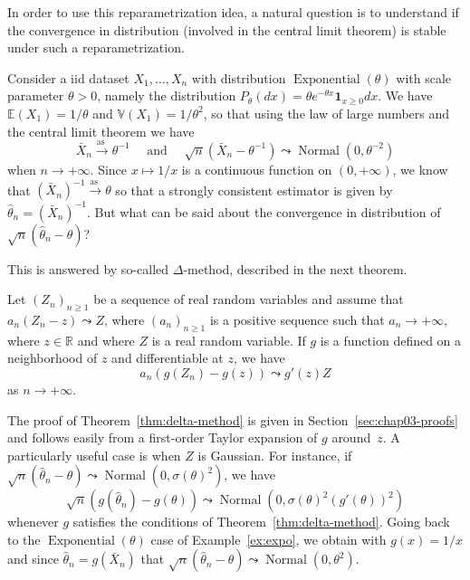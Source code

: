 \documentclass[
	fontsize=11pt, %
	twoside=false, %
	numbers=noenddot, %
]{kaobook}
\DeclareMathOperator{\expo}{Exponential}
\DeclareMathOperator{\nor}{Normal}
\newcommand{\E}{\mathbb E}
\newcommand{\R}{\mathbb R}
\newcommand{\var}{\mathbb V}
\newcommand{\wh}{\widehat}
\newcommand{\ind}[1]{\mathbf 1_{#1}}
\newcommand{\goes}{\rightarrow}
\newcommand{\goas}{\overset{\text{as\ }}{\rightarrow}}
\begin{document}
In order to use this reparametrization idea, a natural question is to understand if the convergence in distribution (involved in the central limit theorem) is stable under such a reparametrization.
\begin{example}
	\label{ex:expo}
	Consider a iid dataset $X_1, \ldots, X_n$ with distribution $\expo(\theta)$ with scale parameter $\theta > 0$, namely the distribution $P_\theta(dx) = \theta e^{-\theta x} \ind{x \geq 0} dx$. 
	We have $\E(X_1) = 1 / \theta$ and $\var(X_1) = 1 / \theta^2$, so that using the law of large numbers and the central limit theorem we have
	\begin{equation*}
		\bar X_n \goas \theta^{-1} \quad \text{ and } \quad \sqrt n (\bar X_n - \theta^{-1}) \leadsto \nor(0, \theta^{-2})
	\end{equation*}
	when $n \rightarrow +\infty$.
	Since $x \mapsto 1 / x$ is a continuous function on $(0, +\infty)$, we know that $(\bar X_n)^{-1} \goas \theta$ so that a strongly consistent estimator is given by $\wh \theta_n = (\bar X_n)^{-1}$.
	But what can be said about the convergence in distribution of $\sqrt n (\wh \theta_n - \theta)$?
\end{example}
This is answered by so-called $\Delta$-method, described in the next theorem.
\begin{theorem}
	\label{thm:delta-method}
 	Let $(Z_n)_{n \geq 1}$ be a sequence of real random variables and assume that 
	$a_n(Z_n - z) \leadsto Z$, where $(a_n)_{n \geq 1}$ is a positive sequence such that $a_n \goes +\infty$, where $z \in \R$ and where $Z$ is a real random variable.
 	If $g$ is a function defined on a neighborhood of $z$ and differentiable at $z$, we have 
 	\begin{equation}
 		a_n (g(Z_n) - g(z)) \leadsto g'(z) Z
 	\end{equation}
 	as $n \goes +\infty$.
\end{theorem}
The proof of Theorem~\ref{thm:delta-method} is given in Section~\ref{sec:chap03-proofs} and follows easily from a first-order Taylor expansion of $g$ around~$z$.
A particularly useful case is when $Z$ is Gaussian.
For instance, if $\sqrt n (\wh \theta_n - \theta) \leadsto \nor(0, \sigma(\theta)^2)$, we have
\begin{equation*}
	\sqrt n (g(\wh \theta_n) - g(\theta)) \leadsto 
	\nor(0, \sigma(\theta)^2 (g'(\theta))^2)
\end{equation*}
whenever $g$ satisfies the conditions of Theorem~\ref{thm:delta-method}.
Going back to the $\expo(\theta)$ case of Example~\ref{ex:expo}, we obtain with $g(x) = 1 / x$ and since $\wh \theta_n = g(\bar X_n)$ that $\sqrt n (\wh \theta_n - \theta) \leadsto \nor(0, \theta^2)$.
\end{document}
